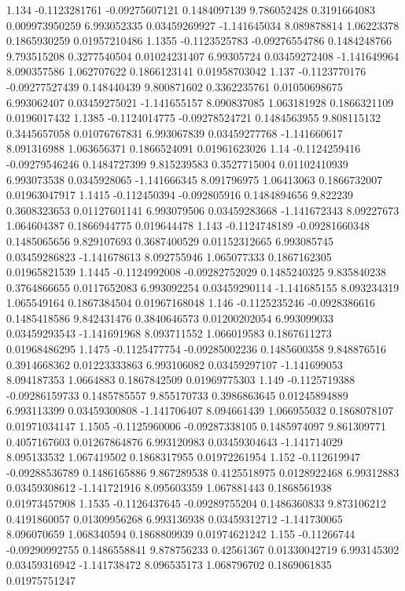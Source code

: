 {1.134 -0.1123281761 -0.09275607121 0.1484097139 9.786052428 0.3191664083 0.009973950259 6.993052335 0.03459269927 -1.141645034 8.089878814 1.06223378 0.1865930259 0.01957210486
1.1355 -0.1123525783 -0.09276554786 0.1484248766 9.793515208 0.3277540504 0.01024231407 6.99305724 0.03459272408 -1.141649964 8.090357586 1.062707622 0.1866123141 0.01958703042
1.137 -0.1123770176 -0.09277527439 0.148440439 9.800871602 0.3362235761 0.01050698675 6.993062407 0.03459275021 -1.141655157 8.090837085 1.063181928 0.1866321109 0.0196017432
1.1385 -0.1124014775 -0.09278524721 0.1484563955 9.808115132 0.3445657058 0.01076767831 6.993067839 0.03459277768 -1.141660617 8.091316988 1.063656371 0.1866524091 0.01961623026
1.14 -0.1124259416 -0.09279546246 0.1484727399 9.815239583 0.3527715004 0.01102410939 6.993073538 0.0345928065 -1.141666345 8.091796975 1.06413063 0.1866732007 0.01963047917
1.1415 -0.112450394 -0.092805916 0.1484894656 9.822239 0.3608323653 0.01127601141 6.993079506 0.03459283668 -1.141672343 8.09227673 1.064604387 0.1866944775 0.019644478
1.143 -0.1124748189 -0.09281660348 0.1485065656 9.829107693 0.3687400529 0.01152312665 6.993085745 0.03459286823 -1.141678613 8.092755946 1.065077333 0.1867162305 0.01965821539
1.1445 -0.1124992008 -0.09282752029 0.1485240325 9.835840238 0.3764866655 0.0117652083 6.993092254 0.03459290114 -1.141685155 8.093234319 1.065549164 0.1867384504 0.01967168048
1.146 -0.1125235246 -0.0928386616 0.1485418586 9.842431476 0.3840646573 0.01200202054 6.993099033 0.03459293543 -1.141691968 8.093711552 1.066019583 0.1867611273 0.01968486295
1.1475 -0.1125477754 -0.09285002236 0.1485600358 9.848876516 0.3914668362 0.01223333863 6.993106082 0.03459297107 -1.141699053 8.094187353 1.0664883 0.1867842509 0.01969775303
1.149 -0.1125719388 -0.09286159733 0.1485785557 9.855170733 0.3986863645 0.01245894889 6.993113399 0.03459300808 -1.141706407 8.094661439 1.066955032 0.1868078107 0.01971034147
1.1505 -0.1125960006 -0.09287338105 0.1485974097 9.861309771 0.4057167603 0.01267864876 6.993120983 0.03459304643 -1.141714029 8.095133532 1.067419502 0.1868317955 0.01972261954
1.152 -0.112619947 -0.09288536789 0.1486165886 9.867289538 0.4125518975 0.0128922468 6.99312883 0.03459308612 -1.141721916 8.095603359 1.067881443 0.1868561938 0.01973457908
1.1535 -0.1126437645 -0.09289755204 0.1486360833 9.873106212 0.4191860057 0.01309956268 6.993136938 0.03459312712 -1.141730065 8.096070659 1.068340594 0.1868809939 0.01974621242
1.155 -0.11266744 -0.09290992755 0.1486558841 9.878756233 0.42561367 0.01330042719 6.993145302 0.03459316942 -1.141738472 8.096535173 1.068796702 0.1869061835 0.01975751247
}
